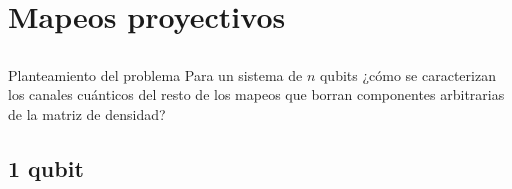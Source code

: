 \documentclass[11pt,xcolor=dvipsnames]{beamer}
\begin{document}
\section{Mapeos proyectivos}



\subsection*{}
\begin{frame}{Planteamiento del problema}
	Para un sistema de $n$ qubits ¿cómo se caracterizan los canales cuánticos del resto de los 
	mapeos que borran componentes	arbitrarias de la matriz de densidad?
\end{frame}



\subsection{1 qubit}
\end{document}

